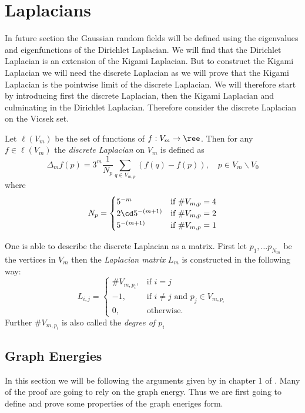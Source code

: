 \chapter{Laplacians}
In future section the Gaussian random fields will be defined using the eigenvalues and eigenfunctions of the Dirichlet Laplacian. We will find that the Dirichlet Laplacian is an extension of the Kigami Laplacian. But to construct the Kigami Laplacian we will need the discrete Laplacian as we will prove that the Kigami Laplacian is the pointwise limit of the discrete Laplacian. We will therefore start by introducing first the discrete Laplacian, then the Kigami Laplacian and culminating in the Dirichlet Laplacian. Therefore consider the discrete Laplacian on the Vicsek set.
\begin{defi}\label{discreteLaplacian}
	Let $\ell(V_m)$ be the set of functions of $f: V_m \to \ree$. Then for any $f \in \ell(V_m)$  the \emph{discrete Laplacian} on $V_m$ is defined as
	\begin{equation}
		\Delta_m f(p) = 3^{m} \frac{1}{N_p}\sum_{q \in V_{m,p}} (f(q) - f(p)), \quad p \in V_m \backslash V_0
	\end{equation}
	where $$N_p = \begin{cases}
		5^{-m} & \text{if } \# V_{m,p} = 4 \\
		2\cd 5^{-(m+1)} & \text{if } \# V_{m,p} = 2\\
		5^{-(m+1)}  & \text{if } \# V_{m,p} = 1
	\end{cases}$$
\end{defi}

\begin{remark}\label{discreteMatrix}
	One is able to describe the discrete Laplacian as a matrix. First let $p_1, \ldots p_{N_m}$ be the vertices in $V_m$ then the \emph{Laplacian matrix} $L_m$ is constructed in the following way:
	\begin{equation}
		L_{i,j} = \begin{cases}
			\#V_{m,p_i}, & \text{if } i= j \\
			-1, & \text{if } i \neq j \text{ and } p_j \in V_{m,p_i} \\
			0, & \text{otherwise.}
		\end{cases}
	\end{equation}
Further $\#V_{m,p_i}$ is also called the \emph{degree of $p_i$}
\end{remark}

\section{Graph Energies}
In this section we will be following the arguments given by in chapter 1 of \cite{strichartz}. Many of the proof are going to rely on the graph energy. Thus we are first going to define and prove some properties of the graph eneriges form.

